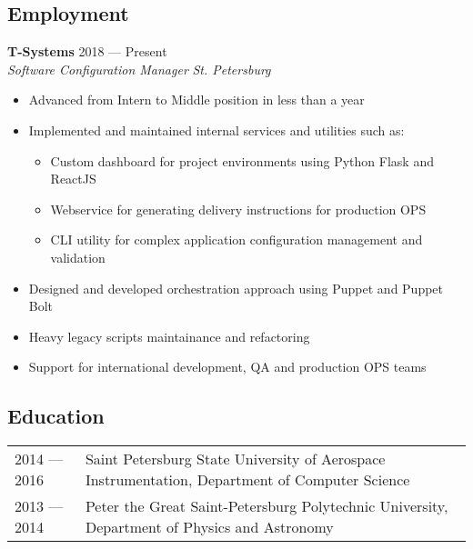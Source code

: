 \documentclass[12pt]{report}
\newenvironment{JobDescription}[4]{
    {\bf #1 } \hfill { #2}
    \\
    {\em #3 } \hfill {\em #4 }
    \begin{itemize}
} {
    \end{itemize}
}
\begin{document}
\subsection*{Employment}
\begin{JobDescription}{T-Systems}{2018 --- Present}{Software Configuration Manager}{St. Petersburg}
    \item Advanced from Intern to Middle position in less than a year
    \item Implemented and maintained internal services and utilities such as:
    \begin{itemize}
        \item Custom dashboard for project environments using Python Flask and ReactJS
        \item Webservice for generating delivery instructions for production OPS
        \item CLI utility for complex application configuration management and validation
    \end{itemize}
    \item Designed and developed orchestration approach using Puppet and Puppet Bolt
    \item Heavy legacy scripts maintainance and refactoring
    \item Support for international development, QA and production OPS teams
\end{JobDescription}

\subsection*{Education}
\begin{table}[!h]
    \begin{tabular}{@{}p{}p{}}
        2014 --- 2016 & Saint Petersburg State University of Aerospace Instrumentation, Department of Computer Science \\
        2013 --- 2014 & Peter the Great Saint-Petersburg Polytechnic University, Department of Physics and Astronomy
    \end{tabular}
\end{table}
\end{document}
